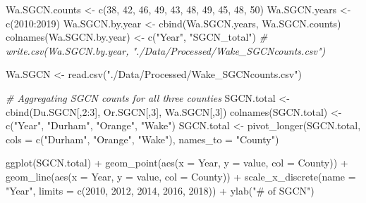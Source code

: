 \documentclass[
  12pt,
]{article}
\newenvironment{Shaded}{\begin{snugshade}}{\end{snugshade}}
\newcommand{\AttributeTok}[1]{\textcolor[rgb]{0.77,0.63,0.00}{#1}}
\newcommand{\CommentTok}[1]{\textcolor[rgb]{0.56,0.35,0.01}{\textit{#1}}}
\newcommand{\DecValTok}[1]{\textcolor[rgb]{0.00,0.00,0.81}{#1}}
\newcommand{\FunctionTok}[1]{\textcolor[rgb]{0.00,0.00,0.00}{#1}}
\newcommand{\NormalTok}[1]{#1}
\newcommand{\OtherTok}[1]{\textcolor[rgb]{0.56,0.35,0.01}{#1}}
\newcommand{\SpecialCharTok}[1]{\textcolor[rgb]{0.00,0.00,0.00}{#1}}
\newcommand{\StringTok}[1]{\textcolor[rgb]{0.31,0.60,0.02}{#1}}
\begin{document}
\begin{Shaded}
\begin{Highlighting}[]
\NormalTok{Wa.SGCN.counts }\OtherTok{\textless{}{-}} \FunctionTok{c}\NormalTok{(}\DecValTok{38}\NormalTok{, }\DecValTok{42}\NormalTok{, }\DecValTok{46}\NormalTok{, }\DecValTok{49}\NormalTok{, }\DecValTok{43}\NormalTok{, }\DecValTok{48}\NormalTok{, }\DecValTok{49}\NormalTok{, }\DecValTok{45}\NormalTok{, }\DecValTok{48}\NormalTok{, }\DecValTok{50}\NormalTok{)}
\NormalTok{Wa.SGCN.years }\OtherTok{\textless{}{-}} \FunctionTok{c}\NormalTok{(}\DecValTok{2010}\SpecialCharTok{:}\DecValTok{2019}\NormalTok{)}
\NormalTok{Wa.SGCN.by.year }\OtherTok{\textless{}{-}} \FunctionTok{cbind}\NormalTok{(Wa.SGCN.years, Wa.SGCN.counts)}
\FunctionTok{colnames}\NormalTok{(Wa.SGCN.by.year) }\OtherTok{\textless{}{-}} \FunctionTok{c}\NormalTok{(}\StringTok{"Year"}\NormalTok{, }\StringTok{"SGCN\_total"}\NormalTok{)}
  \CommentTok{\# write.csv(Wa.SGCN.by.year, "./Data/Processed/Wake\_SGCNcounts.csv")}

\NormalTok{Wa.SGCN }\OtherTok{\textless{}{-}} \FunctionTok{read.csv}\NormalTok{(}\StringTok{"./Data/Processed/Wake\_SGCNcounts.csv"}\NormalTok{)}

\CommentTok{\# Aggregating SGCN counts for all three counties}
\NormalTok{SGCN.total }\OtherTok{\textless{}{-}} \FunctionTok{cbind}\NormalTok{(Du.SGCN[,}\DecValTok{2}\SpecialCharTok{:}\DecValTok{3}\NormalTok{], Or.SGCN[,}\DecValTok{3}\NormalTok{], Wa.SGCN[,}\DecValTok{3}\NormalTok{])}
\FunctionTok{colnames}\NormalTok{(SGCN.total) }\OtherTok{\textless{}{-}} \FunctionTok{c}\NormalTok{(}\StringTok{"Year"}\NormalTok{, }\StringTok{"Durham"}\NormalTok{, }\StringTok{"Orange"}\NormalTok{, }\StringTok{"Wake"}\NormalTok{)}
\NormalTok{SGCN.total }\OtherTok{\textless{}{-}} \FunctionTok{pivot\_longer}\NormalTok{(SGCN.total, }\AttributeTok{cols =} \FunctionTok{c}\NormalTok{(}\StringTok{"Durham"}\NormalTok{, }\StringTok{"Orange"}\NormalTok{, }\StringTok{"Wake"}\NormalTok{), }
                           \AttributeTok{names\_to =} \StringTok{"County"}\NormalTok{)}

\FunctionTok{ggplot}\NormalTok{(SGCN.total) }\SpecialCharTok{+} \FunctionTok{geom\_point}\NormalTok{(}\FunctionTok{aes}\NormalTok{(}\AttributeTok{x =}\NormalTok{ Year, }\AttributeTok{y =}\NormalTok{ value, }\AttributeTok{col =}\NormalTok{ County)) }\SpecialCharTok{+} 
  \FunctionTok{geom\_line}\NormalTok{(}\FunctionTok{aes}\NormalTok{(}\AttributeTok{x =}\NormalTok{ Year, }\AttributeTok{y =}\NormalTok{ value, }\AttributeTok{col =}\NormalTok{ County)) }\SpecialCharTok{+} 
  \FunctionTok{scale\_x\_discrete}\NormalTok{(}\AttributeTok{name =} \StringTok{"Year"}\NormalTok{, }\AttributeTok{limits =} \FunctionTok{c}\NormalTok{(}\DecValTok{2010}\NormalTok{, }\DecValTok{2012}\NormalTok{, }\DecValTok{2014}\NormalTok{, }\DecValTok{2016}\NormalTok{, }\DecValTok{2018}\NormalTok{)) }\SpecialCharTok{+} 
  \FunctionTok{ylab}\NormalTok{(}\StringTok{"\# of SGCN"}\NormalTok{)}
\end{Highlighting}
\end{Shaded}
\end{document}
